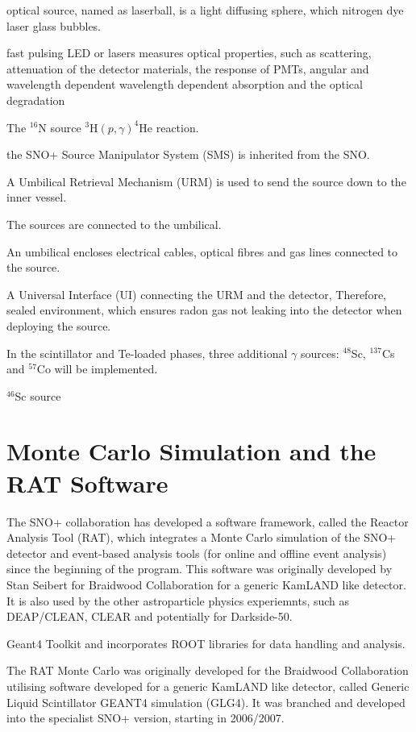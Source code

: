 optical source, named as laserball, is a light diffusing sphere, which nitrogen dye laser glass bubbles.



fast pulsing LED or lasers
measures optical properties, such as scattering, attenuation of the detector materials, the response of PMTs, 
angular and wavelength dependent
wavelength dependent absorption and the optical degradation




The $^{16}$N source
$^{3}$H$(p,\gamma)^{4}$He reaction.

the SNO+ Source Manipulator System (SMS)
is inherited from the SNO.

A Umbilical Retrieval Mechanism (URM) is used to send the source down to the inner vessel.

The sources are connected to the umbilical.

An umbilical encloses electrical cables, optical fibres and gas lines connected to the source.

A Universal Interface (UI) connecting the URM and the detector, 
Therefore, sealed environment, which 
ensures radon gas not leaking into the detector when deploying the source.


In the scintillator and Te-loaded phases, three additional $\gamma$ sources: $^{48}$Sc, $^{137}$Cs and $^{57}$Co will be implemented.

$^{46}$Sc source

\section{Monte Carlo Simulation and the RAT Software}
The SNO+ collaboration has developed a software framework, called the Reactor Analysis
Tool (RAT), which integrates a Monte Carlo simulation of the SNO+ detector and event-based analysis tools (for online and offline event analysis) since the beginning of the program. This software was originally developed by Stan Seibert for Braidwood Collaboration for a generic KamLAND like detector. It is also used by the other astroparticle physics experiemnts, such as DEAP/CLEAN, CLEAR and potentially for Darkside-50\cite{rat}.

Geant4 Toolkit and
incorporates ROOT libraries for data handling and analysis.

The RAT Monte Carlo was originally developed for the Braidwood Collaboration
utilising software developed for a generic KamLAND like detector, called Generic Liquid Scintillator GEANT4 simulation (GLG4). It was branched and
developed into the specialist SNO+ version, starting in 2006/2007.

